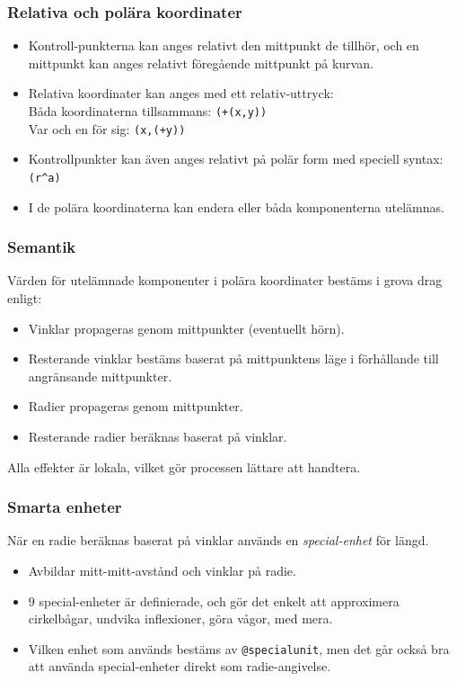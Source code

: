 \documentclass[noamsthm,handout]{beamer}
\begin{document}
\begin{frame}\frametitle{Relativa och polära koordinater}
  \begin{itemize}
  \item Kontroll-punkterna kan anges relativt den mittpunkt de tillhör, och en mittpunkt kan anges relativt föregående mittpunkt på kurvan.
  \item Relativa koordinater kan anges med ett relativ-uttryck:\\
    Båda koordinaterna tillsammans: \texttt{{\color{red}(+}(x,y){\color{red})}}\\
    Var och en för sig: \texttt{(x,{\color{red}(+}y{\color{red})})}
  \item Kontrollpunkter kan även anges relativt på polär form med speciell syntax:\\
    \texttt{{\color{red}(}r{\color{red}\textasciicircum}a{\color{red})}}
  \item I de polära koordinaterna kan endera eller båda komponenterna utelämnas.
  \end{itemize}
\end{frame}
\begin{frame}\frametitle{Semantik}
  Värden för utelämnade komponenter i polära koordinater bestäms i grova drag enligt:
  \begin{itemize}
  \item Vinklar propageras genom mittpunkter (eventuellt hörn).
  \item Resterande vinklar bestäms baserat på mittpunktens läge i förhållande till angränsande mittpunkter.
  \item Radier propageras genom mittpunkter.
  \item Resterande radier beräknas baserat på vinklar.
  \end{itemize}

  Alla effekter är lokala, vilket gör processen lättare att handtera.
\end{frame}
\begin{frame}\frametitle{Smarta enheter}
  När en radie beräknas baserat på vinklar används en \emph{special-enhet} för längd.
  \begin{itemize}
  \item Avbildar mitt-mitt-avstånd och vinklar på radie.
  \item $9$ special-enheter är definierade, och gör det enkelt att approximera cirkelbågar, undvika inflexioner, göra vågor, med mera.
  \item Vilken enhet som används bestäms av \texttt{@specialunit}, men det går också bra att använda special-enheter direkt som radie-angivelse.
  \end{itemize}
\end{frame}
\end{document}
